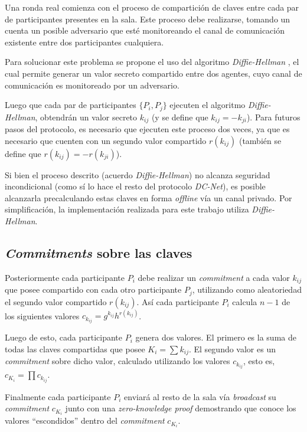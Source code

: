 Una ronda real comienza con el proceso de compartición de claves entre cada 
par de participantes presentes en la sala. Este proceso debe realizarse, 
tomando un cuenta un posible adversario que esté monitoreando el canal de 
comunicación existente entre dos participantes cualquiera.

Para solucionar este problema se propone el uso del algoritmo 
\emph{Diffie-Hellman} \cite{diffie1976new}, el cual permite generar un valor 
secreto compartido entre dos agentes, cuyo canal de comunicación es 
monitoreado por un adversario.

Luego que cada par de participantes $\{P_i, P_j\}$ ejecuten el algoritmo 
\emph{Diffie-Hellman}, obtendrán un valor secreto $k_{ij}$ 
(y se define que $k_{ij} = -k_{ji}$). Para futuros pasos del protocolo, es 
necesario que ejecuten este proceso dos veces, ya que es necesario que cuenten 
con un segundo valor compartido $r(k_{ij})$ (también se define que 
$r(k_{ij}) = -r(k_{ji})$).

Si bien el proceso descrito (acuerdo \emph{Diffie-Hellman}) no alcanza 
seguridad incondicional (como sí lo hace el resto del protocolo \emph{DC-Net}), 
es posible alcanzarla precalculando estas claves en forma \emph{offline} vía 
un canal privado. Por simplificación, la implementación realizada para este 
trabajo utiliza \emph{Diffie-Hellman}.

\subsection{\emph{Commitments} sobre las claves}

Posteriormente cada participante $P_i$ debe realizar un \emph{commitment} a 
cada valor $k_{ij}$ que posee compartido con cada otro participante $P_j$, 
utilizando como aleatoriedad el segundo valor compartido $r(k_{ij})$. Así cada 
participante $P_i$ calcula $n - 1$ de los siguientes valores 
$c_{k_{ij}} = g^{k_{ij}} h^{r(k_{ij})}$.

Luego de esto, cada participante $P_i$ genera dos valores. El primero es 
la suma de todas las claves compartidas que posee $K_i = \sum k_{ij}$. El 
segundo valor es un \emph{commitment} sobre dicho valor, calculado utilizando 
los valores $c_{k_{ij}}$, esto es, 
$c_{K_i} = \prod c_{k_{ij}}$.

Finalmente cada participante $P_i$ enviará al resto de la sala vía 
\emph{broadcast} su \emph{commitment} $c_{K_i}$ junto con una 
\emph{zero-knowledge proof} demostrando que conoce los valores ``escondidos'' 
dentro del \emph{commitment} $c_{K_i}$.

